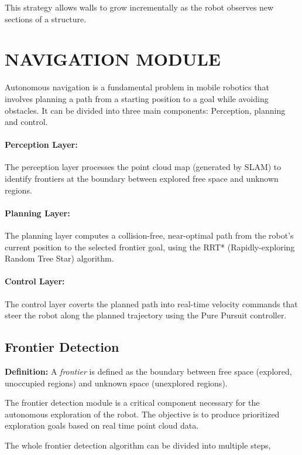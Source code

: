 \documentclass[11pt]{article}
\begin{document}
This strategy allows walls to grow incrementally as the robot observes new sections of a structure.

\section{NAVIGATION MODULE}

Autonomous navigation is a fundamental problem in mobile robotics that involves planning a path from a starting position to a goal while avoiding obstacles. It can be divided into three main components: Perception, planning and control.

\paragraph{Perception Layer:} The perception layer processes the point cloud map (generated by SLAM) to identify frontiers at the boundary between explored free space and unknown regions.

\paragraph{Planning Layer:} The planning layer computes a collision-free, near-optimal path from the robot's current position to the selected frontier goal, using the RRT* (Rapidly-exploring Random Tree Star) algorithm.

\paragraph{Control Layer:} The control layer coverts the planned path into real-time velocity commands that steer the robot along the planned trajectory using the Pure Pursuit controller.

\subsection{Frontier Detection}

\textbf{Definition:} A \emph{frontier} is defined as the boundary between free space (explored, unoccupied regions) and unknown space (unexplored regions).

The frontier detection module is a critical component necessary for the autonomous exploration of the robot. The objective is to produce prioritized exploration goals based on real time point cloud data.

The whole frontier detection algorithm can be divided into multiple steps, 
\end{document}
